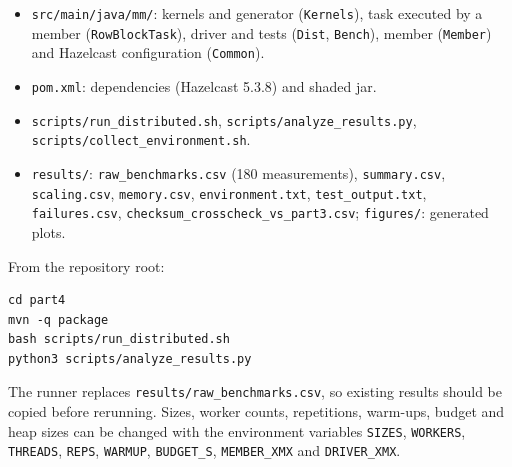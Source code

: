 \documentclass[11pt,a4paper]{article}
\begin{document}
\begin{itemize}
  \item \texttt{src/main/java/mm/}: kernels and generator (\texttt{Kernels}), task executed
        by a member (\texttt{RowBlockTask}), driver and tests (\texttt{Dist}, \texttt{Bench}),
        member (\texttt{Member}) and Hazelcast configuration (\texttt{Common}).
  \item \texttt{pom.xml}: dependencies (Hazelcast 5.3.8) and shaded jar.
  \item \texttt{scripts/run\_distributed.sh}, \texttt{scripts/analyze\_results.py},
        \texttt{scripts/collect\_environment.sh}.
  \item \texttt{results/}: \texttt{raw\_benchmarks.csv} (180 measurements), \texttt{summary.csv},
        \texttt{scaling.csv}, \texttt{memory.csv}, \texttt{environment.txt},
        \texttt{test\_output.txt}, \texttt{failures.csv},
        \texttt{checksum\_crosscheck\_vs\_part3.csv}; \texttt{figures/}: generated plots.
\end{itemize}
From the repository root:
\begin{verbatim}
cd part4
mvn -q package
bash scripts/run_distributed.sh
python3 scripts/analyze_results.py
\end{verbatim}
The runner replaces \texttt{results/raw\_benchmarks.csv}, so existing results should be copied
before rerunning. Sizes, worker counts, repetitions, warm-ups, budget and heap sizes can be
changed with the environment variables \texttt{SIZES}, \texttt{WORKERS}, \texttt{THREADS},
\texttt{REPS}, \texttt{WARMUP}, \texttt{BUDGET\_S}, \texttt{MEMBER\_XMX} and
\texttt{DRIVER\_XMX}.
\end{document}
